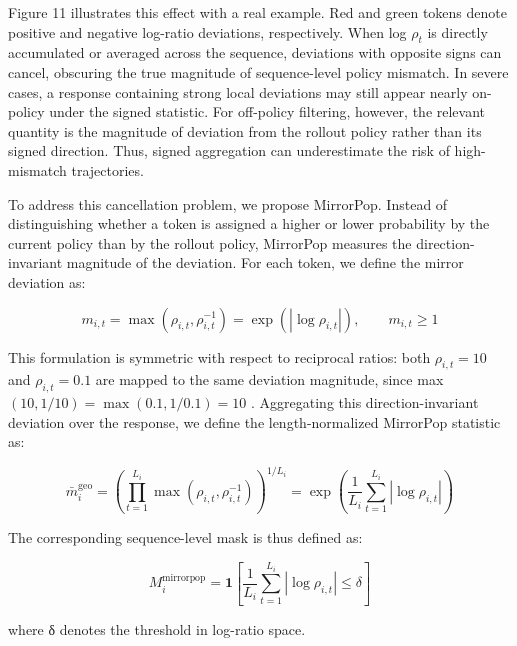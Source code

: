 \documentclass[
  10
]{article}
\begin{document}
Figure 11 illustrates this effect with a real example. Red and green
tokens denote positive and negative log-ratio deviations, respectively.
When log \(\rho _ { t }\) is directly accumulated or averaged across the
sequence, deviations with opposite signs can cancel, obscuring the true
magnitude of sequence-level policy mismatch. In severe cases, a response
containing strong local deviations may still appear nearly on-policy
under the signed statistic. For off-policy filtering, however, the
relevant quantity is the magnitude of deviation from the rollout policy
rather than its signed direction. Thus, signed aggregation can
underestimate the risk of high-mismatch trajectories.

To address this cancellation problem, we propose MirrorPop. Instead of
distinguishing whether a token is assigned a higher or lower probability
by the current policy than by the rollout policy, MirrorPop measures the
direction-invariant magnitude of the deviation. For each token, we
define the mirror deviation as:

\[
m _ {i, t} = \max (\rho_ {i, t}, \rho_ {i, t} ^ {- 1}) = \exp (| \log \rho_ {i, t} |), \qquad m _ {i, t} \geq 1\tag{19}
\]

This formulation is symmetric with respect to reciprocal ratios: both
\(\rho _ { i , t } = 1 0\) and \(\rho _ { i , t } = 0 . 1\) are mapped
to the same deviation magnitude, since max
\(( 1 0 , 1 / 1 0 ) = \operatorname* { m a x } ( 0 . 1 , 1 / 0 . 1 ) = 1 0\)
. Aggregating this direction-invariant deviation over the response, we
define the length-normalized MirrorPop statistic as:

\[
\bar {m} _ {i} ^ {\mathrm{geo}} = \left(\prod_ {t = 1} ^ {L _ {i}} \max (\rho_ {i, t}, \rho_ {i, t} ^ {- 1})\right) ^ {1 / L _ {i}} = \exp \left(\frac {1}{L _ {i}} \sum_ {t = 1} ^ {L _ {i}} | \log \rho_ {i, t} |\right)\tag{20}
\]

The corresponding sequence-level mask is thus defined as:

\[
M _ {i} ^ {\mathrm{mirrorpop}} = \mathbf {1} \left[ \frac {1}{L _ {i}} \sum_ {t = 1} ^ {L _ {i}} | \log \rho_ {i, t} | \leq \delta \right]\tag{21}
\]

where δ denotes the threshold in log-ratio space.
\end{document}

